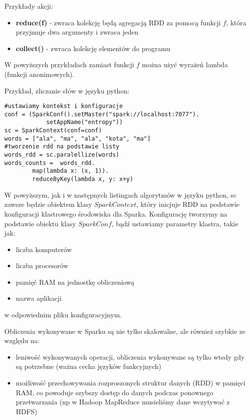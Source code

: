\documentclass[magisterska]{pracamgr}
\theoremstyle{plain}
\theoremstyle{definition}
\theoremstyle{remark}
\begin{document}
Przykłady akcji:
\begin{itemize}
 \item \textbf{reduce(f)} - zwraca kolekcję będą agregacją RDD za pomocą funkcji $f$, która przyjmuje dwa 
 argumenty i zwraca jeden
 \item \textbf{collect()} - zwraca kolekcję elementów do programu
\end{itemize}

W powyższych przykładach zamiast funkcji $f$ można użyć wyrażeń lambda (funkcji anonimowych).

Przykład, zliczanie słów w języku python:
\begin{lstlisting}
#ustawiamy kontekst i konfiguracje
conf = (SparkConf().setMaster("spark://localhost:7077").
		    setAppName("entropy"))
sc = SparkContext(conf=conf)
words = ["ala", "ma", "ala", "kota", "ma"]
#tworzenie rdd na podstawie listy
words_rdd = sc.paralellize(words)  
words_counts =  words_rdd.
		map(lambda x: (x, 1)).
		reduceByKey(lambda x, y: x+y)
\end{lstlisting}

W powyższym, jak i w następnych listingach algorytmów w języku python, sc zawsze będzie obiektem klasy $SparkContext$, który inicjuje
RDD na podstawie konfiguracji klastrowego środowiska dla Sparka. Konfigurację tworzymy na podstawie obiektu klasy $SparkConf$, bądź
ustawiamy parametry klastra, takie jak:
\begin{itemize}
 \item liczba komputerów
 \item liczba procesorów
 \item pamięć RAM na jednostkę obliczeniową
 \item nazwa aplikacji
\end{itemize}
w odpowiednim pliku konfiguracyjnym. 


Obliczenia wykonywane w Sparku są nie tylko skalowalne, ale również szybkie ze względu na:
\begin{itemize}
 \item leniwość wykonywanych operacji, obliczenia wykonywane są tylko wtedy gdy są potrzebne (ważna cecha
 języków funkcyjnych)
 \item możliwość przechowywania rozproszonych struktur danych (RDD) w pamięci RAM, co powoduje szybszy dostęp do danych
 podczas ponownego przetwarzania (np w Hadoop MapReduce musieliśmy dane wczytywać z HDFS)
\end{itemize}

\newpage
\end{document}
